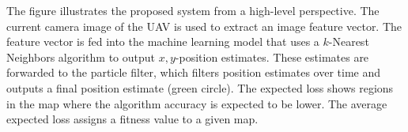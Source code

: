 The figure illustrates the proposed system from a high-level perspective. The current camera image of the UAV is used to extract an image feature vector. The feature vector is fed into the machine learning model that uses a $k$-Nearest Neighbors algorithm to output $x,y$-position estimates. These estimates are forwarded to the particle filter, which filters position estimates over time and outputs a final position estimate (green circle). The expected loss shows regions in the map where the algorithm accuracy is expected to be lower. The average expected loss assigns a fitness value to a given map. 